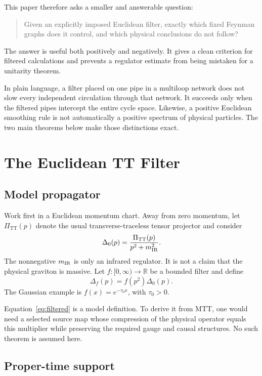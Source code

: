 \documentclass[11pt]{article}
\newcommand{\RR}{\mathbb{R}}
\newcommand{\TT}{\mathrm{TT}}
\begin{document}
This paper therefore asks a smaller and answerable question:
\begin{quote}
Given an explicitly imposed Euclidean filter, exactly which fixed Feynman
graphs does it control, and which physical conclusions do not follow?
\end{quote}
The answer is useful both positively and negatively. It gives a clean
criterion for filtered calculations and prevents a regulator estimate from
being mistaken for a unitarity theorem.

In plain language, a filter placed on one pipe in a multiloop network does
not slow every independent circulation through that network. It succeeds
only when the filtered pipes intercept the entire cycle space. Likewise, a
positive Euclidean smoothing rule is not automatically a positive spectrum
of physical particles. The two main theorems below make those distinctions
exact.

\section{The Euclidean TT Filter}

\subsection{Model propagator}

Work first in a Euclidean momentum chart. Away from zero momentum, let
\(\Pi_{\TT}(p)\) denote the usual transverse-traceless tensor projector and
consider
\begin{equation}
 \Delta_0(p)
 =\frac{\Pi_{\TT}(p)}{p^2+m_{\rm IR}^2}.
 \label{eq:bare}
\end{equation}
The nonnegative \(m_{\rm IR}\) is only an infrared regulator. It is not a
claim that the physical graviton is massive. Let \(f:[0,\infty)\to\RR\) be a
bounded filter and define
\begin{equation}
 \Delta_f(p)=f(p^2)\Delta_0(p).
 \label{eq:filtered}
\end{equation}
The Gaussian example is \(f(x)=e^{-\tau_0x}\), with \(\tau_0>0\).

Equation~\eqref{eq:filtered} is a model definition. To derive it from MTT,
one would need a selected source map whose compression of the physical
operator equals this multiplier while preserving the required gauge and
causal structures. No such theorem is assumed here.

\subsection{Proper-time support}
\end{document}
